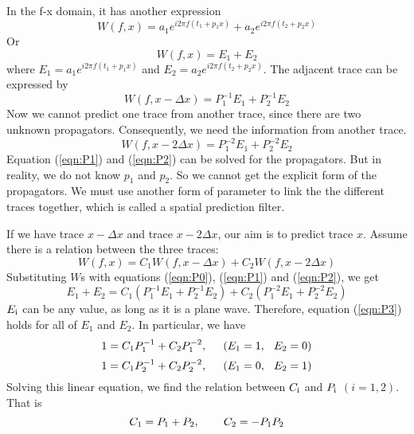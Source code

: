 
In the {\rm f-x} domain, it has another expression
\begin{equation}
	W(f,x) = a_1e^{i2\pi f(t_1+p_1x)}+a_2e^{i2\pi f(t_2+p_2x)}
\end{equation}
Or
\begin{equation}
	W(f,x) = E_1+E_2
\label{eqn:P0}
\end{equation}
where $E_1 = a_1e^{i2\pi f(t_1+p_1x)}$ and $E_2=a_2e^{i2\pi f(t_2+p_2x)}$.
The adjacent trace can be expressed by
\begin{equation}
	W(f,x-\Delta x)=P^{-1}_1E_1+P^{-1}_2E_2
\label{eqn:P1}
\end{equation}
Now we cannot predict one trace from another trace, since there are two 
unknown propagators. Consequently, we need the information from another trace.
\begin{equation}
	W(f,x-2\Delta x)=P^{-2}_1E_1+P^{-2}_2E_2 
\label{eqn:P2}
\end{equation}
Equation (\ref{eqn:P1}) and (\ref{eqn:P2}) can be solved for the propagators. But in 
reality, we do not know $p_1$ and $p_2$. So we cannot get the explicit 
form of the propagators. We must use another form of parameter to link the 
the different traces together, which is called a spatial prediction filter.
\par
If we have trace $x-\Delta x$ and trace $x-2\Delta x$, our aim is 
to predict trace $x$. Assume there is a relation between the three traces:
\begin{equation}
	W(f,x) = C_1W(f,x-\Delta x)+C_2W(f,x-2\Delta x)
\end{equation}
Substituting $W$s with equations (\ref{eqn:P0}), (\ref{eqn:P1}) and (\ref{eqn:P2}), we get
\begin{equation}
	E_1+E_2 = C_1(P^{-1}_1E_1+P^{-1}_2E_2)+C_2(P^{-2}_1E_1+P^{-2}_2E_2)
\label{eqn:P3}
\end{equation}
$E_{\rm i}$ can be any value, as long as it is a plane wave. Therefore, 
equation (\ref{eqn:P3}) holds for all of $E_1$ and $E_2$. In particular, we have
\begin{equation}
1 = C_1P^{-1}_1+C_2P^{-2}_1, \hspace*{0.2in}(E_1 = 1, \hspace*{0.1in}E_2 = 0)
\end{equation}
\begin{equation}
1 = C_1P^{-1}_2+C_2P^{-2}_2, \hspace*{0.2in}(E_1 = 0, \hspace*{0.1in}E_2 = 1)
\end{equation}
Solving this linear equation, we find the relation between $C_{\rm i}$ and 
$P_{\rm i}$ $(i=1,2)$. That is
\begin{equation}
	C_1 = P_1 + P_2, \hspace*{0.3in} C_2 = -P_1P_2
\end{equation}

